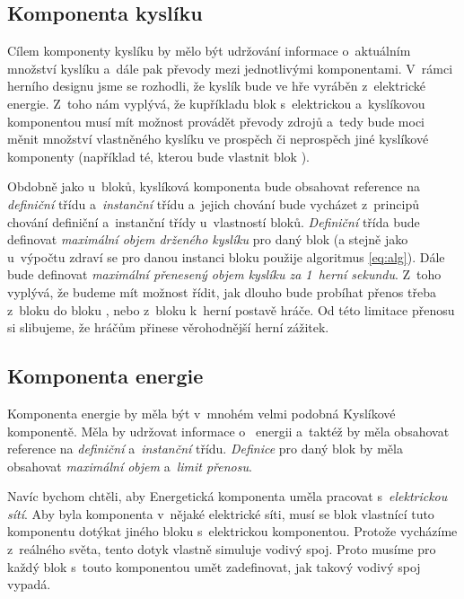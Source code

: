 \subsection{Komponenta kyslíku}

Cílem komponenty kyslíku by mělo být udržování informace o~aktuálním množství  kyslíku a~dále pak převody mezi jednotlivými komponentami. V~rámci herního designu jsme se rozhodli, že kyslík bude ve hře vyráběn z~elektrické energie. Z~toho nám vyplývá, že kupříkladu blok s~elektrickou a~kyslíkovou komponentou musí mít možnost provádět převody zdrojů a~tedy bude moci měnit množství vlastněného kyslíku ve prospěch či neprospěch jiné kyslíkové komponenty (například té, kterou bude vlastnit blok ). 



Obdobně jako u~bloků, kyslíková komponenta bude obsahovat reference na \textit{definiční} třídu a~\textit{instanční} třídu a~jejich chování bude vycházet z~principů chování definiční a~instanční třídy u~vlastností bloků. \textit{Definiční} třída bude definovat \textit{maximální objem drženého kyslíku} pro daný blok (a stejně jako u~výpočtu zdraví se pro danou instanci bloku použije algoritmus \ref{eq:alg}). Dále bude definovat \textit{maximální přenesený objem kyslíku za 1~herní sekundu}. Z~toho vyplývá, že budeme mít možnost řídit, jak dlouho bude probíhat přenos třeba z~bloku  do bloku , nebo z~bloku  k~herní postavě hráče. Od této limitace přenosu si slibujeme, že hráčům přinese  věrohodnější herní zážitek. 

\subsection{Komponenta energie}
\label{subsec:encomp}

Komponenta energie by měla být v~mnohém velmi podobná Kyslíkové komponentě. Měla by udržovat informace o~ energii a~taktéž by měla obsahovat reference na \textit{definiční} a~\textit{instanční} třídu. \textit{Definice} pro daný blok by měla obsahovat \textit{maximální objem} a~\textit{limit přenosu}. 

Navíc bychom chtěli, aby Energetická komponenta uměla pracovat s~\textit{elektrickou sítí}. Aby byla komponenta v~nějaké elektrické síti, musí se blok vlastnící tuto komponentu dotýkat jiného bloku s~elektrickou komponentou. Protože vycházíme z~reálného světa, tento dotyk vlastně simuluje vodivý spoj. Proto musíme pro každý blok s~touto komponentou umět zadefinovat, jak takový vodivý spoj vypadá.


